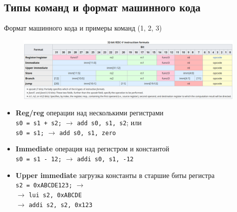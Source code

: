 \documentclass[xetex,aspectratio=43]{beamer}
\begin{document}
\subsection{Типы команд и формат машинного кода}

\begin{frame}[fragile]{Формат машинного кода и примеры команд (1, 2, 3)}
    \begin{figure}
        \includegraphics[width=1\linewidth]{img/12.RISCV_instruction_format_wikipedia}
    \end{figure}

    \begin{itemize}
        \tightlist
        \item \textbf{Reg/reg} операции над несколькими регистрами \\
        \texttt{s0 = s1 + s2;} $\rightarrow$ \texttt{add s0, s1, s2}; или\\
        \texttt{s0 = s1;} $\rightarrow$ \texttt{add s0, s1, zero}
        \item \textbf{Immediate} операция над регистром и константой \\
        \texttt{s0 = s1 - 12;} $\rightarrow$ \texttt{addi s0, s1, -12}
        \item \textbf{Upper immediate} загрузка константы в старшие биты регистра\\
        \texttt{s2 = 0xABCDE123;} $\rightarrow$ \\
        $\rightarrow$ \texttt{lui s2, 0xABCDE} \\
        {\color{white} $\rightarrow$} \texttt{addi s2, s2, 0x123}
    \end{itemize}
\end{frame}
\end{document}
